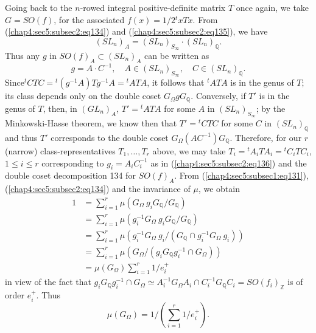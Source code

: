 Going back to the $n$-rowed integral positive-definite matrix $T$ once
again, we take $G=SO(f)$, for the associated $f(x)=1/2{}^{t}xTx$. From
(\ref{chap4:sec5:subsec2:eq134}) and
(\ref{chap4:sec5:subsec2:eq135}), we have 
\begin{equation*}
  (SL_{n})_{A}=(SL_{n})_{S_{\infty}}\cdot (SL_{n})_{\mathbb{Q}}.
  \tag*{$(135)'$}\label{chap4:sec5:subsec2:eq135_1}
\end{equation*}
Thus any $g$ in $SO(f)_{A}\subset (SL_{n})_{A}$ can be written as
\begin{equation*}
g=A\cdot C^{-1},\quad A\in(SL_{n})_{S_{\infty}},\quad C\in
(SL_{n})_{\mathbb{Q}}.\tag{136}\label{chap4:sec5:subsec2:eq136}
\end{equation*}
Since\pageoriginale ${}^{t}CTC={}^{t}(g^{-1}A)Tg^{-1}A={}^{t}ATA$, it
follows that ${}^{t}ATA$ is in the genus of $T$; its class depends
only on the double coset $G_{\Omega}gG_{\mathbb{Q}}$. Conversely, if
$T'$ is in the genus of $T$, then, in $(GL_{n})_{A}$, $T'={}^{t}ATA$
for some $A$ in $(SL_{n})_{S_{\infty}}$; by the Minkowski-Hasse
theorem, we know then that $T'={}^{t}CTC$ for some $C$ in
$(SL_{n})_{\mathbb{Q}}$ and thus $T'$ corresponds to the double coset
$G_{\Omega}(AC^{-1})G_{\mathbb{Q}}$. Therefore, for our $r$ (narrow)
class-representatives $T_{1},\ldots,T_{r}$ above, we may take
$T_{i}={}^{t}A_{i}TA_{i}={}^{t}C_{i}TC_{i}$, $1\leq i\leq r$
corresponding to $g_{i}=A_{i}C^{-1}_{i}$ as in
(\ref{chap4:sec5:subsec2:eq136}) and the
double coset decomposition {134} for $SO(f)_{A}$. From
(\ref{chap4:sec5:subsec1:eq131}), (\ref{chap4:sec5:subsec2:eq134}) and
the invariance of $\mu$, we obtain 
\begin{align*}
1 &= \sum^{r}_{i=1}\mu(G_{\Omega}~g_{i}G_{\mathbb{Q}}/G_{\mathbb{Q}})\\
&=
\sum^{r}_{i=1}\mu(g^{-1}_{i}G_{\Omega}~g_{i}G_{\mathbb{Q}}/G_{\mathbb{Q}})\\
&= \sum^{r}_{i=1}\mu(g^{-1}_{i}G_{\Omega}~g_{i}/(G_{\mathbb{Q}}\cap
g^{-1}_{i}G_{\Omega}~g_{i}))\\
&= \sum^{r}_{i=1}\mu(G_{\Omega}/(g_{i}G_{\mathbb{Q}}g^{-1}_{i}\cap
G_{\Omega}))\\
&= \mu(G_{\Omega})\sum^{r}_{i=1}1/e^{+}_{i}
\end{align*}
in view of the fact that $g_{i}G_{\mathbb{Q}}g^{-1}_{i}\cap
G_{\Omega}\simeq A^{-1}_{i}G_{\Omega}A_{i}\cap
C^{-1}_{i}G_{\mathbb{Q}}C_{i}=SO(f_{i})_{\mathbb{Z}}$ is of order
$e^{+}_{i}$. Thus 
\begin{equation*}
  \mu(G_{\Omega})=1/\left(\sum^{r}_{i=1}1/e^{+}_{i}\right).
  \tag{137}\label{chap4:sec5:subsec2:eq137}
\end{equation*}


